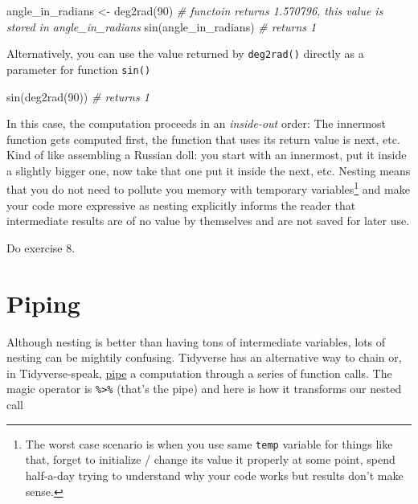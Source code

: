 \documentclass[
]{book}
\newenvironment{Shaded}{\begin{snugshade}}{\end{snugshade}}
\newcommand{\CommentTok}[1]{\textcolor[rgb]{0.56,0.35,0.01}{\textit{#1}}}
\newcommand{\DecValTok}[1]{\textcolor[rgb]{0.00,0.00,0.81}{#1}}
\newcommand{\FunctionTok}[1]{\textcolor[rgb]{0.00,0.00,0.00}{#1}}
\newcommand{\NormalTok}[1]{#1}
\newcommand{\OtherTok}[1]{\textcolor[rgb]{0.56,0.35,0.01}{#1}}
\begin{document}
\begin{Shaded}
\begin{Highlighting}[]
\NormalTok{angle\_in\_radians }\OtherTok{\textless{}{-}} \FunctionTok{deg2rad}\NormalTok{(}\DecValTok{90}\NormalTok{) }\CommentTok{\# functoin returns 1.570796, this value is stored in angle\_in\_radians}
\FunctionTok{sin}\NormalTok{(angle\_in\_radians) }\CommentTok{\# returns 1}
\end{Highlighting}
\end{Shaded}

Alternatively, you can use the value returned by \texttt{deg2rad()} directly as a parameter for function \texttt{sin()}

\begin{Shaded}
\begin{Highlighting}[]
\FunctionTok{sin}\NormalTok{(}\FunctionTok{deg2rad}\NormalTok{(}\DecValTok{90}\NormalTok{)) }\CommentTok{\# returns 1}
\end{Highlighting}
\end{Shaded}

In this case, the computation proceeds in an \emph{inside-out} order: The innermost function gets computed first, the function that uses its return value is next, etc. Kind of like assembling a Russian doll: you start with an innermost, put it inside a slightly bigger one, now take that one put it inside the next, etc. Nesting means that you do not need to pollute you memory with temporary variables\footnote{The worst case scenario is when you use same \texttt{temp} variable for things like that, forget to initialize / change its value it properly at some point, spend half-a-day trying to understand why your code works but results don't make sense.} and make your code more expressive as nesting explicitly informs the reader that intermediate results are of no value by themselves and are not saved for later use.

Do exercise 8.

\hypertarget{piping}{%
\section{Piping}\label{piping}}

Although nesting is better than having tons of intermediate variables, lots of nesting can be mightily confusing. Tidyverse has an alternative way to chain or, in Tidyverse-speak, \href{https://magrittr.tidyverse.org/reference/pipe.html}{pipe} a computation through a series of function calls. The magic operator is \texttt{\%\textgreater{}\%} (that's the pipe) and here is how it transforms our nested call
\end{document}
